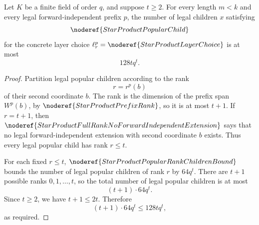 \begin{helper}
Let \(K\) be a finite field of order \(q\), and suppose \(t\ge2\).  For
every length \(m<k\) and every legal forward-independent prefix \(p\), the
number of legal children \(x\) satisfying
\[
  \noderef{StarProductPopularChild}
\]
for the concrete layer choice
\(\ell^p_r=\noderef{StarProductLayerChoice}\) is at most
\[
  128tq^t .
\]
\end{helper}
\begin{proof}
Partition legal popular children according to the rank
\[
  r=r^p(b)
\]
of their second coordinate \(b\).  The rank is the dimension of the prefix
span \(W^p(b)\), by \(\noderef{StarProductPrefixRank}\), so it is at most
\(t+1\).  If \(r=t+1\), then
\(\noderef{StarProductFullRankNoForwardIndependentExtension}\) says that no
legal forward-independent extension with second coordinate \(b\) exists.
Thus every legal popular child has rank \(r\le t\).

For each fixed \(r\le t\), \(\noderef{StarProductPopularRankChildrenBound}\)
bounds the number of legal popular children of rank \(r\) by \(64q^t\).
There are \(t+1\) possible ranks \(0,1,\ldots,t\), so the total number of
legal popular children is at most
\[
  (t+1)\cdot 64q^t.
\]
Since \(t\ge2\), we have \(t+1\le2t\).  Therefore
\[
  (t+1)\cdot64q^t\le 128tq^t,
\]
as required.
\end{proof}
